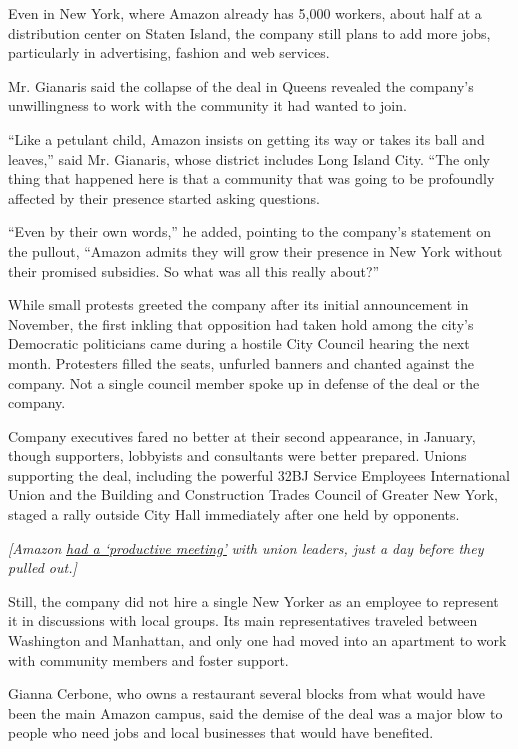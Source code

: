 Even in New York, where Amazon already has 5,000 workers, about half at
a distribution center on Staten Island, the company still plans to add
more jobs, particularly in advertising, fashion and web services.

Mr. Gianaris said the collapse of the deal in Queens revealed the
company's unwillingness to work with the community it had wanted to
join.

``Like a petulant child, Amazon insists on getting its way or takes its
ball and leaves,'' said Mr. Gianaris, whose district includes Long
Island City. ``The only thing that happened here is that a community
that was going to be profoundly affected by their presence started
asking questions.

``Even by their own words,'' he added, pointing to the company's
statement on the pullout, ``Amazon admits they will grow their presence
in New York without their promised subsidies. So what was all this
really about?''

While small protests greeted the company after its initial announcement
in November, the first inkling that opposition had taken hold among the
city's Democratic politicians came during a hostile City Council hearing
the next month. Protesters filled the seats, unfurled banners and
chanted against the company. Not a single council member spoke up in
defense of the deal or the company.

Company executives fared no better at their second appearance, in
January, though supporters, lobbyists and consultants were better
prepared. Unions supporting the deal, including the powerful 32BJ
Service Employees International Union and the Building and Construction
Trades Council of Greater New York, staged a rally outside City Hall
immediately after one held by opponents.

\emph{{[}Amazon}
\href{https://www.nytimes3xbfgragh.onion/2019/02/14/business/economy/amazon-union-cuomo.html}{\emph{had
a `productive meeting'}} \emph{with union leaders, just a day before
they pulled out.{]}}

Still, the company did not hire a single New Yorker as an employee to
represent it in discussions with local groups. Its main representatives
traveled between Washington and Manhattan, and only one had moved into
an apartment to work with community members and foster support.

Gianna Cerbone, who owns a restaurant several blocks from what would
have been the main Amazon campus, said the demise of the deal was a
major blow to people who need jobs and local businesses that would have
benefited.

